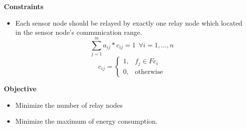 \documentclass[paper.tex]{subfiles}
\begin{document}
	\textbf{Constraints}
	\begin{itemize}
		\item  Each sensor node should be relayed by exactly one relay node which located in the sensor node's communication range.
		\begin{equation}
			\sum_{j=1}^{m}a_{ij}*c_{ij} = 1 ~~ \forall i = 1,...,n
		\end{equation}	
		\begin{equation}
			c_{ij} = \begin{cases}
			1, & f_j \in Fc_i\\
			0, & \text{otherwise}
			\end{cases}
		\end{equation}
	\end{itemize}

	\textbf{Objective}
	\begin{itemize}
		\item Minimize the number of relay nodes
		\item Minimize the maximum of energy consumption. 
	\end{itemize}

	
\end{document}
